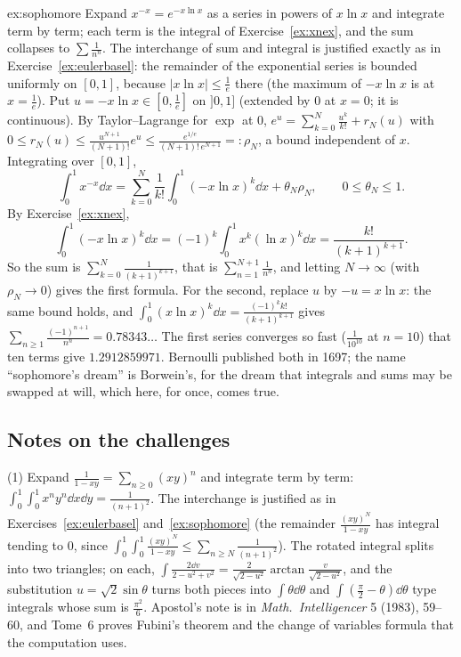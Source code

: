 \begin{solution}{ex:sophomore}
\idea Expand $x^{-x}=e^{-x\ln x}$ as a series in powers of $x\ln x$ and integrate term by term; each term is the integral of Exercise~\ref{ex:xnex}, and the sum collapses to $\sum\frac1{n^n}$. The interchange of sum and integral is justified exactly as in Exercise~\ref{ex:eulerbasel}: the remainder of the exponential series is bounded uniformly on $[0,1]$, because $|x\ln x|\le\frac1e$ there (the maximum of $-x\ln x$ is at $x=\frac1e$).
\writeup Put $u=-x\ln x\in\left[0,\frac1e\right]$ on $]0,1]$ (extended by $0$ at $x=0$; it is continuous). By Taylor--Lagrange for $\exp$ at $0$, $e^u=\sum_{k=0}^N\frac{u^k}{k!}+r_N(u)$ with $0\le r_N(u)\le\frac{u^{N+1}}{(N+1)!}e^{u}\le\frac{e^{1/e}}{(N+1)!\,e^{N+1}}=:\rho_N$, a bound independent of $x$. Integrating over $[0,1]$,
\[
\int_0^1x^{-x}\dd x=\sum_{k=0}^N\frac1{k!}\int_0^1(-x\ln x)^k\dd x+\theta_N\rho_N,\qquad0\le\theta_N\le1.
\]
By Exercise~\ref{ex:xnex},
\[
\int_0^1(-x\ln x)^k\dd x=(-1)^k\int_0^1x^k(\ln x)^k\dd x=\frac{k!}{(k+1)^{k+1}} .
\]
So the sum is $\sum_{k=0}^N\frac1{(k+1)^{k+1}}$, that is $\sum_{n=1}^{N+1}\frac1{n^n}$, and letting $N\to\infty$ (with $\rho_N\to0$) gives the first formula. For the second, replace $u$ by $-u=x\ln x$: the same bound holds, and $\int_0^1(x\ln x)^k\dd x=\frac{(-1)^kk!}{(k+1)^{k+1}}$ gives $\sum_{n\ge1}\frac{(-1)^{n+1}}{n^n}=0.78343\ldots$ The first series converges so fast ($\frac1{10^{10}}$ at $n=10$) that ten terms give $1.2912859971$. Bernoulli published both in 1697; the name ``sophomore's dream'' is Borwein's, for the dream that integrals and sums may be swapped at will, which here, for once, comes true.
\end{solution}

\subsection*{Notes on the challenges}

(1) Expand $\frac1{1-xy}=\sum_{n\ge0}(xy)^n$ and integrate term by term: $\int_0^1\!\!\int_0^1x^ny^n\dd x\dd y=\frac1{(n+1)^2}$. The interchange is justified as in Exercises~\ref{ex:eulerbasel} and~\ref{ex:sophomore} (the remainder $\frac{(xy)^N}{1-xy}$ has integral tending to $0$, since $\int_0^1\!\!\int_0^1\frac{(xy)^N}{1-xy}\le\sum_{n\ge N}\frac1{(n+1)^2}$). The rotated integral splits into two triangles; on each, $\int\frac{2\dd v}{2-u^2+v^2}=\frac2{\sqrt{2-u^2}}\arctan\frac v{\sqrt{2-u^2}}$, and the substitution $u=\sqrt2\sin\theta$ turns both pieces into $\int\theta\dd\theta$ and $\int(\frac\pi2-\theta)\dd\theta$ type integrals whose sum is $\frac{\pi^2}6$. Apostol's note is in \emph{Math.\ Intelligencer} 5 (1983), 59--60, and Tome~6 proves Fubini's theorem and the change of variables formula that the computation uses.

